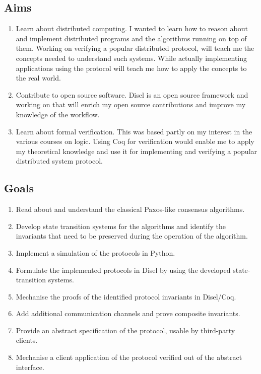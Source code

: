 \subsection{Aims}
\begin{enumerate}
\itemsep0em
  \item Learn about distributed computing. I wanted to learn how to reason about
    and implement distributed programs and the algorithms running on top of them.
    Working on verifying a popular distributed protocol, will teach me
    the concepts needed to understand such systems. While actually implementing
    applications using the protocol will teach me how to apply the concepts to
    the real world.
  \item Contribute to open source software. Disel is an open source framework
    and working on that will enrich my open source contributions and improve
    my knowledge of the workflow.
  \item Learn about formal verification. This was based partly on my interest in
    the various courses on logic. Using Coq for verification would enable me
    to apply my theoretical knowledge and use it for
    implementing and verifying a popular distributed system protocol.

\end{enumerate}

\vspace{-5mm}
\subsection{Goals}
\begin{enumerate}
\itemsep0em
  \item Read about and understand the classical Paxos-like consensus algorithms.
  \item Develop state transition systems for the algorithms and identify the invariants that need to be preserved during the operation of the algorithm.
  \item Implement a simulation of the protocols in Python.
  \item Formulate the implemented protocols in Disel by using the developed state-transition systems.
  \item Mechanise the proofs of the identified protocol invariants in Disel/Coq.
  \item Add additional communication channels and prove composite invariants.
  \item Provide an abstract specification of the protocol, usable by third-party clients.
  \item Mechanise a client application of the protocol verified out of the abstract interface.
\end{enumerate}


